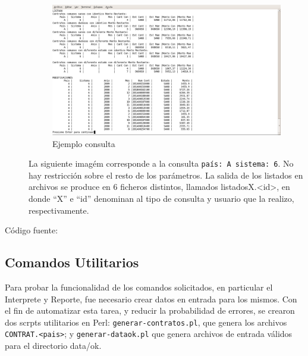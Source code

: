 \documentclass[12pt]{article}
\begin{document}
\begin{description}
	\begin{figure}[H]
	\centering
	\includegraphics[scale=0.35]{imagenes/reporte/reporte_listadosYModificaciones_A_6.png}
	\caption{Ejemplo consulta}
	\end{figure}

        La siguiente imagém corresponde a la consulta \verb|país: A sistema: 6|.
        No hay restricción sobre el resto de los parámetros.
        La salida de los listados en archivos se produce en 6 ficheros distintos, llamados listadosX.<id>, en donde ``X'' e ``id'' denominan al tipo de consulta y usuario que la realizo, respectivamente. 


	\item [Código fuente:]

\end{description}
{\footnotesize

}

\subsection{Comandos Utilitarios}
	Para probar la funcionalidad de los comandos solicitados, en particular el Interprete y Reporte, fue necesario crear datos en entrada para los mismos. Con el fin de automatizar esta tarea, y reducir la probabilidad de errores, se crearon dos scrpts utilitarios en  Perl: \verb|generar-contratos.pl|, que genera los archivos \verb|CONTRAT.<pais>|; y \verb|generar-dataok.pl| que genera archivos de entrada v\'alidos para el directorio data/ok.
\end{document}
